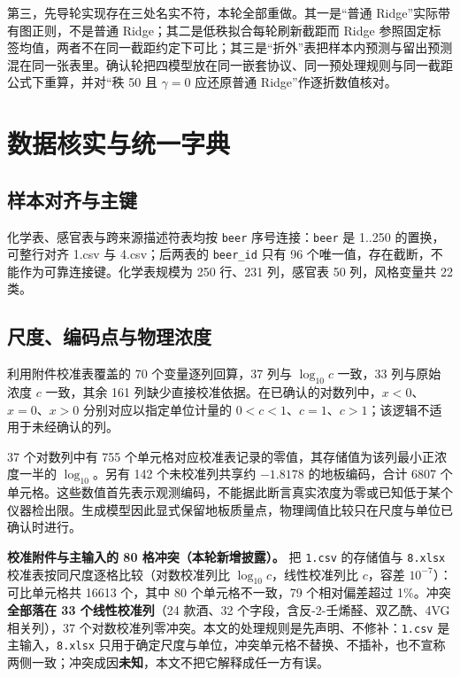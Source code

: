 \documentclass[11pt,a4paper]{article}
\begin{document}
第三，先导轮实现存在三处名实不符，本轮全部重做。其一是``普通
Ridge''实际带有图正则，不是普通 Ridge；其二是低秩拟合每轮刷新截距而
Ridge
参照固定标签均值，两者不在同一截距约定下可比；其三是``折外''表把样本内预测与留出预测混在同一张表里。确认轮把四模型放在同一嵌套协议、同一预处理规则与同一截距公式下重算，并对``秩
50 且 \(\gamma=0\) 应还原普通 Ridge''作逐折数值核对。

\section{数据核实与统一字典}\label{ux6570ux636eux6838ux5b9eux4e0eux7edfux4e00ux5b57ux5178}

\subsection{样本对齐与主键}\label{ux6837ux672cux5bf9ux9f50ux4e0eux4e3bux952e}

化学表、感官表与跨来源描述符表均按 \texttt{beer} 序号连接：\texttt{beer}
是 1..250 的置换，可整行对齐 1.csv 与 4.csv；后两表的 \texttt{beer\_id}
只有 96 个唯一值，存在截断，不能作为可靠连接键。化学表规模为 250 行、231
列，感官表 50 列，风格变量共 22 类。

\subsection{尺度、编码点与物理浓度}\label{ux5c3aux5ea6ux7f16ux7801ux70b9ux4e0eux7269ux7406ux6d53ux5ea6}

利用附件校准表覆盖的 70 个变量逐列回算，37 列与 \(\log_{10}c\) 一致，33
列与原始浓度 \(c\) 一致，其余 161
列缺少直接校准依据。在已确认的对数列中，\(x<0\)、\(x=0\)、\(x>0\)
分别对应以指定单位计量的
\(0<c<1\)、\(c=1\)、\(c>1\)；该逻辑不适用于未经确认的列。

37 个对数列中有 755
个单元格对应校准表记录的零值，其存储值为该列最小正浓度一半的
\(\log_{10}\)。另有 142 个未校准列共享约 \(-1.8178\) 的地板编码，合计
6807
个单元格。这些数值首先表示观测编码，不能据此断言真实浓度为零或已知低于某个仪器检出限。生成模型因此显式保留地板质量点，物理阈值比较只在尺度与单位已确认时进行。

\textbf{校准附件与主输入的 80 格冲突（本轮新增披露）。} 把
\texttt{1.csv} 的存储值与 \texttt{8.xlsx}
校准表按同尺度逐格比较（对数校准列比 \(\log_{10}c\)，线性校准列比
\(c\)，容差 \(10^{-7}\)）：可比单元格共 16613 个，其中 80
个单元格不一致，79 个相对偏差超过 1\%。冲突\textbf{全部落在 33
个线性校准列}（24 款酒、32 个字段，含反-2-壬烯醛、双乙酰、4VG
相关列），37
个对数校准列零冲突。本文的处理规则是先声明、不修补：\texttt{1.csv}
是主输入，\texttt{8.xlsx}
只用于确定尺度与单位，冲突单元格不替换、不插补，也不宣称两侧一致；冲突成因\textbf{未知}，本文不把它解释成任一方有误。
\end{document}
